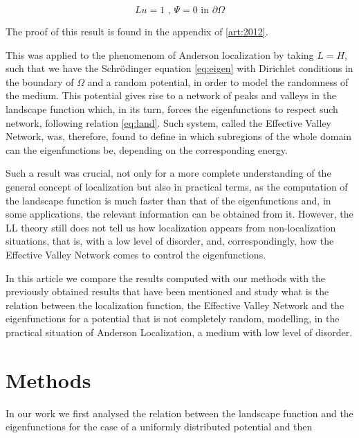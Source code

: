 \documentclass[a4paper,prd,twocolumn,nofootinbib,superscriptaddress,floatfix]{revtex4}
\begin{document}
\begin{equation}
Lu=1 \text{ , } \Psi = 0 \text{ in }\partial\Omega
\label{eq:land}
\end{equation}

The proof of this result is found in the appendix of \ref{art:2012}.

This was applied to the phenomenom of Anderson localization by taking $L=H$, such that we have the Schrödinger equation \ref{eq:eigen} with Dirichlet conditions in the boundary of $\Omega$ and a random potential, in order to model the randomness of the medium. This potential gives rise to a network of peaks and valleys in the landscape function which, in its turn, forces the eigenfunctions to respect such network, following relation \eqref{eq:land}. Such system, called the Effective Valley Network, was, therefore, found to define in which subregions of the whole domain can the eigenfunctions be, depending on the corresponding energy.

Such a result was crucial, not only for a more complete understanding of the general concept of localization but also in practical terms, as the computation of the landscape function is much faster than that of the eigenfunctions and, in some applications, the relevant information can be obtained from it. However, the LL theory still does not tell us how localization appears from non-localization situations, that is, with a low level of disorder, and, correspondingly, how the Effective Valley Network comes to control the eigenfunctions.

In this article we compare the results computed with our methods with the previously obtained results that have been mentioned and study what is the relation between the localization function, the Effective Valley Network and the eigenfunctions for a potential that is not completely random, modelling, in the practical situation of Anderson Localization, a medium with low level of disorder.



\section{Methods}


In our work we first analysed the relation between the landscape function and the eigenfunctions for the case of a uniformly distributed potential and then 
\end{document}
